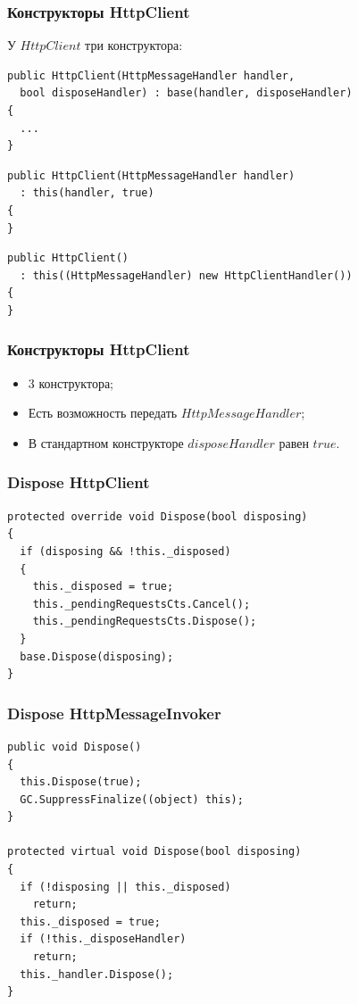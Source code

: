 \documentclass{beamer}
\begin{document}
\begin{frame}[fragile]
\frametitle{Конструкторы HttpClient}
У $HttpClient$ три конструктора:
\newline
\begin{lstlisting}
public HttpClient(HttpMessageHandler handler, 
  bool disposeHandler) : base(handler, disposeHandler)
{
  ...
}
\end{lstlisting}
\begin{lstlisting}
public HttpClient(HttpMessageHandler handler)
  : this(handler, true)
{
}
\end{lstlisting}
\begin{lstlisting}
public HttpClient()
  : this((HttpMessageHandler) new HttpClientHandler())
{
}
\end{lstlisting}
\end{frame}

\begin{frame}
\frametitle{Конструкторы HttpClient}
\begin{itemize}
	\item 3 конструктора;
	\item Есть возможность передать $HttpMessageHandler$;
	\item В стандартном конструкторе $disposeHandler$ равен $true$.
\end{itemize}
\end{frame}

\begin{frame}[fragile]
\frametitle{Dispose HttpClient}
\begin{lstlisting}
protected override void Dispose(bool disposing)
{
  if (disposing && !this._disposed)
  {
    this._disposed = true;
    this._pendingRequestsCts.Cancel();
    this._pendingRequestsCts.Dispose();
  }
  base.Dispose(disposing);
}
\end{lstlisting}
\end{frame}

\begin{frame}[fragile]
\frametitle{Dispose HttpMessageInvoker}
\begin{lstlisting}
public void Dispose()
{
  this.Dispose(true);
  GC.SuppressFinalize((object) this);
}

protected virtual void Dispose(bool disposing)
{
  if (!disposing || this._disposed)
    return;
  this._disposed = true;
  if (!this._disposeHandler)
    return;
  this._handler.Dispose();
}
\end{lstlisting}
\end{frame}
\end{document}
